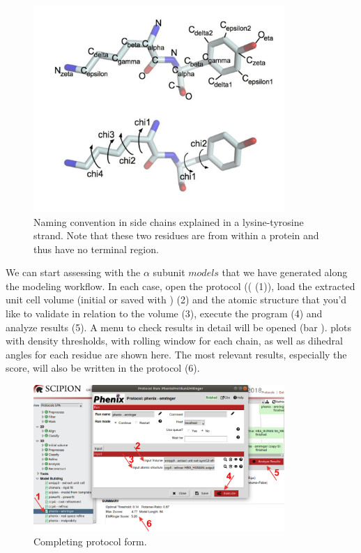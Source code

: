    \begin{figure}[H]
  \centering 
  \captionsetup{width=.7\linewidth} 
  \includegraphics[width=0.85\textwidth]{Images/sidechains}
  \caption{Naming convention in side chains explained in a lysine-tyrosine strand. Note that these two residues are from within a protein and thus have no terminal region.}
  \label{fig:emringer_chi1}
  \end{figure}

  
 We can start assessing with \emringer the  $\alpha$ subunit $models$ that we have generated along the modeling workflow. In each case, open the  protocol (( (1)), load the extracted unit cell volume (initial or saved with \coot) (2) and the atomic structure that you'd like to validate in relation to the volume (3), execute the program (4) and analyze results (5). A menu to check results in detail will be opened (bar ).  plots with density thresholds, with rolling window for each chain, as well as dihedral angles for each residue are shown here. The most relevant results, especially the \emringer score, will also be written in the protocol  (6). 
 
  \begin{figure}[H]
  \centering 
  \captionsetup{width=.7\linewidth} 
  \includegraphics[width=0.85\textwidth]{Images/Fig34}
  \caption{Completing \emringer protocol form.}
  \label{fig:emringer_protocol}
  \end{figure}
 

